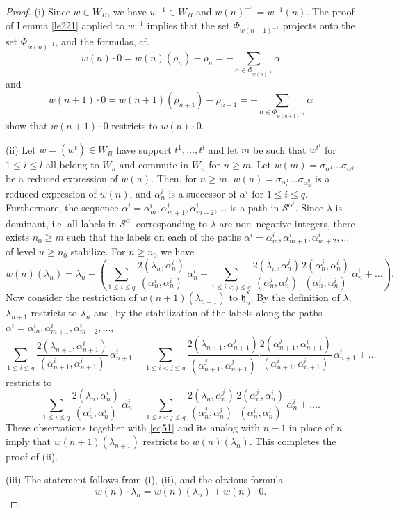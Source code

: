 \documentclass[12pt]{amsart}
\def\gh{\mathfrak{h}}
\def\cS{\mathcal{S}}
\theoremstyle{remark}
\begin{document}
\begin{proof}
(i) Since $w \in W_B$, we have $w^{-1} \in W_B$ and $w(n)^{-1} = w^{-1}(n)$. The proof of Lemma \ref{le221} applied
to $w^{-1}$ implies that the set $\Phi_{w(n+1)^{-1}}$ projects onto the set $\Phi_{w(n)^{-1}}$, and the 
 formulas, cf. \cite{DR},
$$
w(n) \cdot 0 = w(n)(\rho_n) - \rho_n = - \sum_{\alpha \in \Phi_{w(n)^{-1}}} \alpha
$$
and 
$$
w(n+1) \cdot 0 = w(n+1)(\rho_{n+1}) - \rho_{n+1} = - \sum_{\alpha \in \Phi_{w(n+1)^{-1}}} \alpha
$$
show that $w(n+1) \cdot 0$ restricts to $w(n) \cdot 0$.

\noindent
(ii) Let $w = (w^t) \in W_B$ have support $t^1, \ldots, t^l$ and let 
$m$ be such that $w^{t^i}$ for $1 \leq i \leq l$ all belong to $W_n$ and commute
in $W_n$ for $n \geq m$.
Let $w(m) = \sigma_{\alpha^1} \ldots \sigma_{\alpha^q}$ be a reduced expression of $w(n)$. 
Then, for $n \geq m$, $w(n) = \sigma_{\alpha_n^1} \ldots \sigma_{\alpha_n^q}$ is a reduced expression of
$w(n)$, and $\alpha_n^i$ is a successor of $\alpha^i$ for $1 \leq i \leq q$. 
Furthermore, the sequence $\alpha^i = \alpha_m^i, \alpha_{m+1}^i, \alpha_{m+2}^i, \ldots$ is a path in $\cS^{\alpha^i}$. 
Since $\lambda$ is dominant, i.e. all labels in $\cS^{\alpha^i}$ corresponding to $\lambda$ are non--negative integers, 
there exists $n_0 \geq m$ such that the labels on each of the paths  
$\alpha^i = \alpha_m^i, \alpha_{m+1}^i, \alpha_{m+2}^i, \ldots$ of level $n \geq n_0$ stabilize. For $n \geq n_0$ we have
\begin{equation} \label{eq51}
w(n)(\lambda_n) = \lambda_n - \left( \sum_{1\leq i \leq q} \frac{2(\lambda_n, \alpha_n^i)}{(\alpha_n^i, \alpha_n^i)} \, \alpha_n^i - 
\sum_{1 \leq i < j \leq q} \frac{2(\lambda_n, \alpha_n^j)}{(\alpha_n^j, \alpha_n^j)} \frac{2(\alpha_n^j, \alpha_n^i)}{(\alpha_n^i, \alpha_n^i)}
\, \alpha_n^i + \ldots \right).
\end{equation}
Now consider the restriction of $w(n+1)(\lambda_{n+1})$ to $\gh_n^*$. By the definition of $\lambda$, $\lambda_{n+1}$ 
restricts to $\lambda_n$ and, by the stabilization of the labels along the paths 
$\alpha^i = \alpha_m^i, \alpha_{m+1}^i, \alpha_{m+2}^i, \ldots$,
$$ 
 \sum_{1\leq i \leq q} \frac{2(\lambda_{n+1}, \alpha_{n+1}^i)}{(\alpha_{n+1}^i, \alpha_{n+1}^i)} \, \alpha_{n+1}^i - 
\sum_{1 \leq i < j \leq q} \frac{2(\lambda_{n+1}, \alpha_{n+1}^j)}{(\alpha_{n+1}^j, \alpha_{n+1}^j)} 
\frac{2(\alpha_{n+1}^j, \alpha_{n+1}^i)}{(\alpha_{n+1}^i, \alpha_{n+1}^i)}
\, \alpha_{n+1}^i + \ldots 
$$
restricts to
$$
 \sum_{1\leq i \leq q} \frac{2(\lambda_n, \alpha_n^i)}{(\alpha_n^i, \alpha_n^i)} \, \alpha_n^i - 
\sum_{1 \leq i < j \leq q} \frac{2(\lambda_n, \alpha_n^j)}{(\alpha_n^j, \alpha_n^j)} 
\frac{2(\alpha_n^j, \alpha_n^i)}{(\alpha_n^i, \alpha_n^i)}
\, \alpha_n^i + \ldots.
$$
These observations together with \eqref{eq51} and its analog with $n+1$ in place of $n$ imply that 
$w(n+1)(\lambda_{n+1})$ restricts to $w(n)(\lambda_n)$. This completes the proof of (ii).

 \noindent
 (iii) The statement follows from (i), (ii), and the obvious formula
 $$
 w(n) \cdot \lambda_n = w(n)(\lambda_n) + w(n) \cdot 0. 
 $$
\end{proof}
\end{document}
